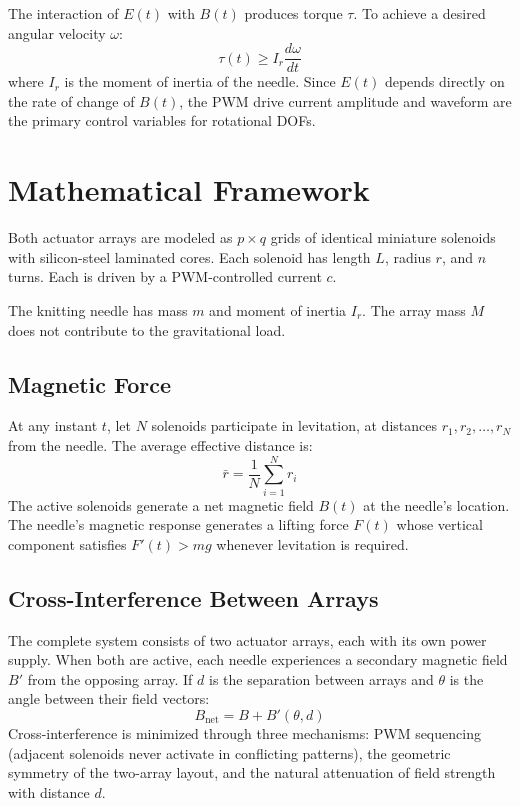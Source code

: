 \documentclass[10pt]{article}
\begin{document}
The interaction of $E(t)$ with $B(t)$ produces torque $\tau$. To achieve a desired angular velocity $\omega$:
\begin{equation}
\tau(t)\geq I_r\frac{d\omega}{dt}
\tag{5}
\end{equation}
where $I_r$ is the moment of inertia of the needle. Since $E(t)$ depends directly on the rate of change of $B(t)$, the PWM drive current amplitude and waveform are the primary control variables for rotational DOFs.

\section{Mathematical Framework}
Both actuator arrays are modeled as $p\times q$ grids of identical miniature solenoids with silicon-steel laminated cores. Each solenoid has length $L$, radius $r$, and $n$ turns. Each is driven by a PWM-controlled current $c$.

The knitting needle has mass $m$ and moment of inertia $I_r$. The array mass $M$ does not contribute to the gravitational load.

\subsection{Magnetic Force}
At any instant $t$, let $N$ solenoids participate in levitation, at distances $r_1,r_2,\ldots,r_N$ from the needle. The average effective distance is:
\begin{equation}
\bar{r}=\frac{1}{N}\sum_{i=1}^{N}r_i
\tag{6}
\end{equation}
The active solenoids generate a net magnetic field $B(t)$ at the needle's location. The needle's magnetic response generates a lifting force $F(t)$ whose vertical component satisfies $F'(t)>mg$ whenever levitation is required.

\subsection{Cross-Interference Between Arrays}
The complete system consists of two actuator arrays, each with its own power supply. When both are active, each needle experiences a secondary magnetic field $B'$ from the opposing array. If $d$ is the separation between arrays and $\theta$ is the angle between their field vectors:
\begin{equation}
B_{\mathrm{net}}=B+B'(\theta,d)
\tag{7}
\end{equation}
Cross-interference is minimized through three mechanisms: PWM sequencing (adjacent solenoids never activate in conflicting patterns), the geometric symmetry of the two-array layout, and the natural attenuation of field strength with distance $d$.
\end{document}
